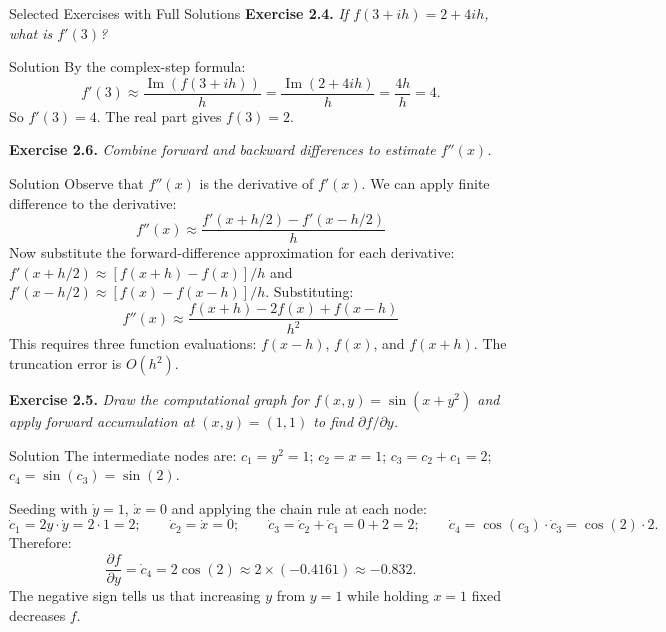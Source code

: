 \documentclass[aspectratio=169,10pt]{beamer}
\begin{document}
\begin{frame}[allowframebreaks]{Selected Exercises with Full Solutions}
  \medskip
  \textbf{Exercise 2.4.}
  \emph{If $f(3 + ih) = 2 + 4ih$, what is $f'(3)$?}

  \begin{block}{Solution}
    By the complex-step formula:
    \[
      f'(3) \approx \frac{\operatorname{Im}(f(3+ih))}{h}
      = \frac{\operatorname{Im}(2 + 4ih)}{h}
      = \frac{4h}{h}
      = 4.
    \]
    So $f'(3) = 4$.  The real part gives $f(3) = 2$.
  \end{block}

  \framebreak

  \textbf{Exercise 2.6.}
  \emph{Combine forward and backward differences to estimate $f''(x)$.}

  \begin{block}{Solution}
    Observe that $f''(x)$ is the derivative of $f'(x)$.  We can apply
    finite difference to the derivative:
    \[
      f''(x)
      \approx \frac{f'(x + h/2) - f'(x - h/2)}{h}
    \]
    Now substitute the forward-difference approximation for each derivative:
    $f'(x+h/2) \approx [f(x+h) - f(x)]/h$ and
    $f'(x-h/2) \approx [f(x) - f(x-h)]/h$.
    Substituting:
    \[
      f''(x)
      \approx \frac{f(x+h) - 2f(x) + f(x-h)}{h^2}
    \]
    This requires three function evaluations: $f(x-h)$, $f(x)$, and
    $f(x+h)$.  The truncation error is $O(h^2)$.
  \end{block}

  \framebreak

  \textbf{Exercise 2.5.}
  \emph{Draw the computational graph for $f(x,y) = \sin(x + y^2)$
  and apply forward accumulation at $(x,y)=(1,1)$ to find
  $\partial f/\partial y$.}

  \begin{block}{Solution}
    The intermediate nodes are:
    $c_1 = y^2 = 1$;\quad
    $c_2 = x = 1$;\quad
    $c_3 = c_2 + c_1 = 2$;\quad
    $c_4 = \sin(c_3) = \sin(2)$.

    Seeding with $\dot{y}=1$, $\dot{x}=0$ and applying the chain rule
    at each node:
    \[
      \dot{c}_1 = 2y \cdot \dot{y} = 2\cdot 1 = 2; \qquad
      \dot{c}_2 = \dot{x} = 0; \qquad
      \dot{c}_3 = \dot{c}_2 + \dot{c}_1 = 0 + 2 = 2; \qquad
      \dot{c}_4 = \cos(c_3)\cdot\dot{c}_3 = \cos(2)\cdot 2.
    \]
    Therefore:
    \[
      \frac{\partial f}{\partial y}
      = \dot{c}_4
      = 2\cos(2)
      \approx 2\times(-0.4161)
      \approx -0.832.
    \]
    The negative sign tells us that increasing $y$ from $y=1$ while
    holding $x=1$ fixed decreases $f$.
  \end{block}

\end{frame}
\end{document}

